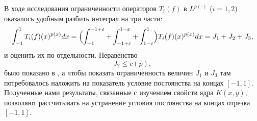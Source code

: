 В ходе исследования ограниченности операторов $T_i(f)$ в $L^{p(\cdot)}$ ($i=1,2$) оказалось удобным разбить интеграл на три части:
\begin{equation*}
\int_{-1}^1 T_i(f)(x)^{p(x)}dx=\Bigl(\int_{-1}^{-1+\varepsilon} + \int_{-1+\varepsilon}^{1-\varepsilon} + \int_{1-\varepsilon}^{1}\Bigr)T_i(f)(x)^{p(x)}dx=J_1+J_2+J_3,
\end{equation*}
и оценить их по отдельности. Неравенство
$$
J_2\le c(p),
$$
было показано в \cite{tad-SHII-Leg}, а чтобы показать ограниченность величин $J_1$ и $J_3$ там потребовалось наложить на показатель условие постоянства на концах $[-1,1]$. Полученные нами результаты, связанные с изучением свойств ядра $K(x,y)$, позволяют рассчитывать на устранение условия постоянства на концах отрезка $[-1,1]$.
